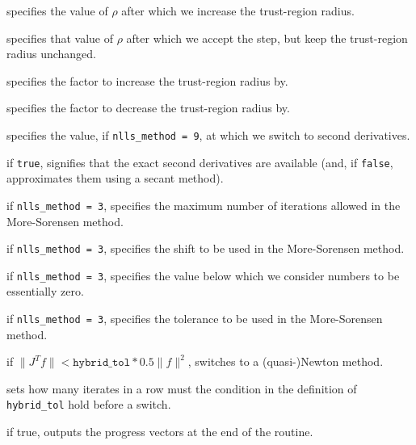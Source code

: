 \documentclass{spec}
\begin{document}
\begin{description}
 specifies the value of $\rho$ after which we increase the trust-region radius.

 specifies that value of $\rho$ after which we accept the step,
but keep the trust-region radius unchanged.

 specifies the factor to increase the trust-region radius by.

 specifies the factor to decrease the trust-region radius by.

 specifies the value, if {\tt nlls\_method = 9},
at which we switch to second derivatives.

 if {\tt true}, signifies that the
exact second derivatives are available (and, if {\tt false}, approximates them using a secant method).

 if {\tt nlls\_method = 3}, specifies the maximum number of iterations allowed in the More-Sorensen method.

 if {\tt nlls\_method = 3}, specifies the shift to be used in the More-Sorensen method.

 if {\tt nlls\_method = 3}, specifies the value
below which we consider numbers to be essentially zero.

 if {\tt nlls\_method = 3}, specifies the tolerance
to be used in the More-Sorensen method.

 if \(\|J^T f \| < \mathtt{hybrid\_tol} * 0.5 \|f\|^2\), switches to a (quasi-)Newton method.

 sets how many iterates in a row must
the condition in the definition of {\tt hybrid\_tol} hold before a switch.

 if true, outputs the progress vectors at the end of the routine.

\end{description}
\end{document}
